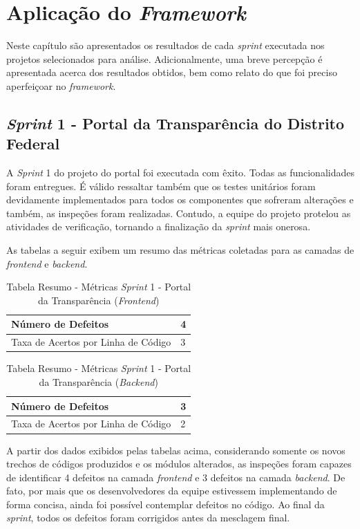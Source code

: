 \chapter{Aplicação do \textit{Framework}}

Neste capítulo são apresentados os resultados de cada \textit{sprint} executada nos projetos selecionados para análise. Adicionalmente, uma breve percepção é apresentada acerca dos resultados obtidos, bem como relato do que foi preciso aperfeiçoar no \textit{framework}.

\section{\textit{Sprint} 1 - Portal da Transparência do Distrito Federal}

A \textit{Sprint} 1 do projeto do portal foi executada com êxito. Todas as funcionalidades foram entregues. É válido ressaltar também que os testes unitários foram devidamente implementados para todos os componentes que sofreram alterações e também, as inspeções foram realizadas. Contudo, a equipe do projeto protelou as atividades de verificação, tornando a finalização da \textit{sprint} mais onerosa.

As tabelas a seguir exibem um resumo das métricas coletadas para as camadas de \textit{frontend} e \textit{backend}.

\begin{table}[h]
\centering
\begin{tabular}{ | m{8cm} | m{8cm} | } 
\hline
Número de Defeitos & 4 \\ 
\hline
Taxa de Acertos por Linha de Código & 3 \\ 
\hline
\end{tabular}
\caption{Tabela Resumo - Métricas \textit{Sprint} 1 - Portal da Transparência (\textit{Frontend})}\label{table:1}
\end{table}

\begin{table}[h]
\centering
\begin{tabular}{ | m{8cm} | m{8cm} | } 
\hline
Número de Defeitos & 3 \\ 
\hline
Taxa de Acertos por Linha de Código & 2 \\ 
\hline
\end{tabular}
\caption{Tabela Resumo - Métricas \textit{Sprint} 1 - Portal da Transparência (\textit{Backend})}\label{table:1}
\end{table}

A partir dos dados exibidos pelas tabelas acima, considerando somente os novos trechos de códigos produzidos e os módulos alterados, as inspeções foram capazes de identificar 4 defeitos na camada \textit{frontend} e 3 defeitos na camada \textit{backend}. De fato, por mais que os desenvolvedores da equipe estivessem implementando de forma concisa, ainda foi possível contemplar defeitos no código. Ao final da \textit{sprint}, todos os defeitos foram corrigidos antes da mesclagem final.

